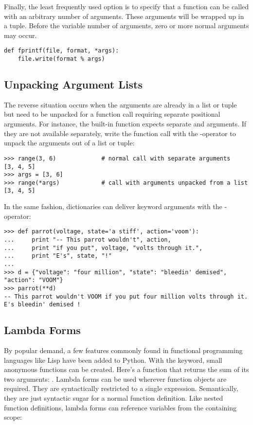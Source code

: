 \documentclass{manual}
\begin{document}
Finally, the least frequently used option is to specify that a
function can be called with an arbitrary number of arguments.  These
arguments will be wrapped up in a tuple.  Before the variable number
of arguments, zero or more normal arguments may occur.

\begin{verbatim}
def fprintf(file, format, *args):
    file.write(format % args)
\end{verbatim}


\subsection{Unpacking Argument Lists \label{unpacking-arguments}}

The reverse situation occurs when the arguments are already in a list
or tuple but need to be unpacked for a function call requiring separate
positional arguments.  For instance, the built-in 
function expects separate  and  arguments.  If they
are not available separately, write the function call with the 
\code{*}-operator to unpack the arguments out of a list or tuple:

\begin{verbatim}
>>> range(3, 6)             # normal call with separate arguments
[3, 4, 5]
>>> args = [3, 6]
>>> range(*args)            # call with arguments unpacked from a list
[3, 4, 5]
\end{verbatim}

In the same fashion, dictionaries can deliver keyword arguments with the
\code{**}-operator:

\begin{verbatim}
>>> def parrot(voltage, state='a stiff', action='voom'):
...     print "-- This parrot wouldn't", action,
...     print "if you put", voltage, "volts through it.",
...     print "E's", state, "!"
...
>>> d = {"voltage": "four million", "state": "bleedin' demised", "action": "VOOM"}
>>> parrot(**d)
-- This parrot wouldn't VOOM if you put four million volts through it. E's bleedin' demised !
\end{verbatim}


\subsection{Lambda Forms \label{lambda}}

By popular demand, a few features commonly found in functional
programming languages like Lisp have been added to Python.  With the
 keyword, small anonymous functions can be created.
Here's a function that returns the sum of its two arguments:
.  Lambda forms can be used wherever function
objects are required.  They are syntactically restricted to a single
expression.  Semantically, they are just syntactic sugar for a normal
function definition.  Like nested function definitions, lambda forms
can reference variables from the containing scope:
\end{document}
